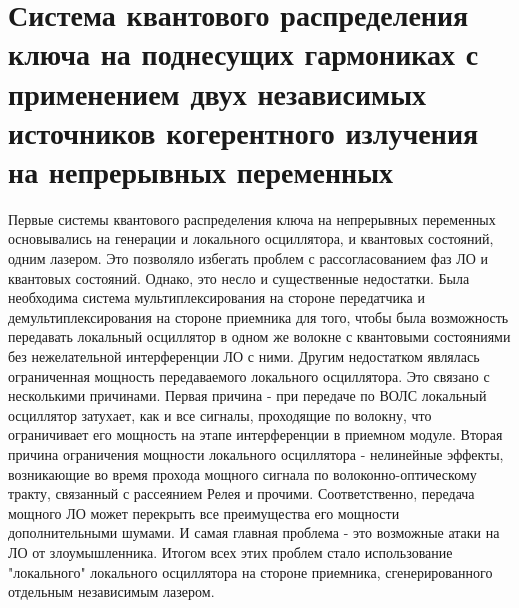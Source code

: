 \chapter{Система квантового распределения ключа на поднесущих гармониках с применением двух независимых источников когерентного излучения на непрерывных переменных}\label{ch:ch3}
Первые системы квантового распределения ключа на непрерывных переменных основывались на генерации и локального осциллятора, и квантовых состояний, одним лазером. Это позволяло избегать проблем с рассогласованием фаз ЛО и квантовых состояний. Однако, это несло и существенные недостатки. Была необходима система мультиплексирования на стороне передатчика и демультиплексирования на стороне приемника для того, чтобы была возможность передавать локальный осциллятор в одном же волокне с квантовыми состояниями без нежелательной интерференции ЛО с ними. Другим недостатком являлась ограниченная мощность передаваемого локального осциллятора. Это связано с несколькими причинами. Первая причина - при передаче по ВОЛС локальный осциллятор затухает, как и все сигналы, проходящие по волокну, что ограничивает его мощность на этапе интерференции в приемном модуле. Вторая причина ограничения мощности локального осциллятора - нелинейные эффекты, возникающие во время прохода мощного сигнала по волоконно-оптическому тракту, связанный с рассеянием Релея и прочими. Соответственно, передача мощного ЛО может перекрыть все преимущества его мощности дополнительными шумами. И самая главная проблема - это возможные атаки на ЛО от злоумышленника. Итогом всех этих проблем стало использование "локального" локального осциллятора на стороне приемника, сгенерированного отдельным независимым лазером.
